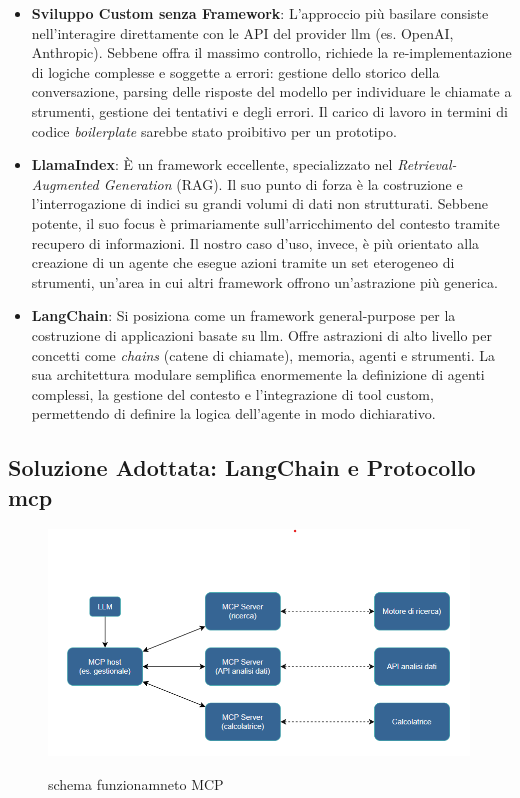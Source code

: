 \begin{itemize}
    \item \textbf{Sviluppo Custom senza Framework}: L'approccio più basilare consiste nell'interagire direttamente con le API del provider \gls{llm} (es. OpenAI, Anthropic). Sebbene offra il massimo controllo, richiede la re-implementazione di logiche complesse e soggette a errori: gestione dello storico della conversazione, parsing delle risposte del modello per individuare le chiamate a strumenti, gestione dei tentativi e degli errori. Il carico di lavoro in termini di codice \textit{boilerplate} sarebbe stato proibitivo per un prototipo.
    
    \item \textbf{LlamaIndex}: È un framework eccellente, specializzato nel \textit{Retrieval-Augmented Generation} (RAG). Il suo punto di forza è la costruzione e l'interrogazione di indici su grandi volumi di dati non strutturati. Sebbene potente, il suo focus è primariamente sull'arricchimento del contesto tramite recupero di informazioni. Il nostro caso d'uso, invece, è più orientato alla creazione di un agente che esegue azioni tramite un set eterogeneo di strumenti, un'area in cui altri framework offrono un'astrazione più generica.
    
    \item \textbf{LangChain}: Si posiziona come un framework general-purpose per la costruzione di applicazioni basate su \gls{llm}. Offre astrazioni di alto livello per concetti come \textit{chains} (catene di chiamate), memoria, agenti e strumenti. La sua architettura modulare semplifica enormemente la definizione di agenti complessi, la gestione del contesto e l'integrazione di tool custom, permettendo di definire la logica dell'agente in modo dichiarativo.
\end{itemize}

\subsection{Soluzione Adottata: LangChain e Protocollo \gls{mcp}}

\begin{figure}[H]
    \centering
    \includegraphics[alt={Schema funzionamento MCP}, height=6cm]{img/schemaMCP.png}
    \caption{schema funzionamneto MCP}
    \label{fig:schemaMCP}
\end{figure}

